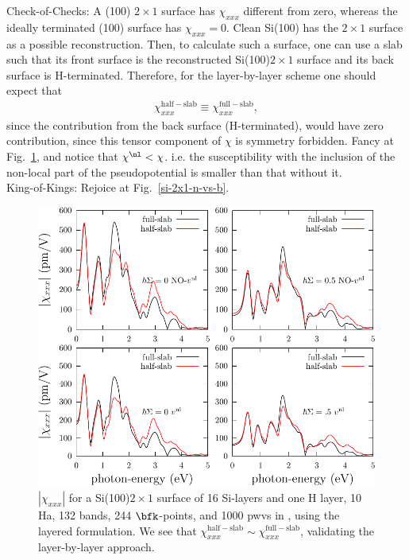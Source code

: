 Check-of-Checks: 
A (100) $2\times 1$ surface has $\chi_{xxx}$
 different from zero,
whereas the ideally terminated (100) surface has $\chi_{xxx}=0$.
Clean Si(100) has the $2\times 1$ surface as a possible
reconstruction. Then, to calculate such a surface, one can use
a slab such that its front surface is the reconstructed 
Si(100)$2\times 1$ surface and its back surface is H-terminated.
Therefore,
 for the
layer-by-layer scheme one should expect that
\begin{align}\label{cc3}
\chi^{\mathrm{half-slab}}_{xxx}
\equiv
\chi^{\mathrm{full-slab}}_{xxx}
,
\end{align}
since the contribution from the back surface (H-terminated), would
have zero contribution, since this tensor component of $\chi$ is
symmetry forbidden. Fancy at
Fig.~\ref{si-2x1}, and notice that $\chi^\nl<\chi$. i.e. the
susceptibility with the inclusion of the non-local part of the
pseudopotential is smaller than that without it.\\
King-of-Kings: Rejoice at 
Fig.~\ref{si-2x1-n-vs-b}.
\begin{figure}[b]
\centering 
\includegraphics[scale=.7]{figures/plots/shg-si-2x1-16}
\caption{$|\chi_{xxx}|$ 
for a Si(100)$2\times 1$ surface of 16 Si-layers and one H layer, 10 
Ha, 132 bands,  244 $\bfk$-points, and 1000 pwvs in \depe,
 using 
the layered formulation. We see that 
$\chi^{\mathrm{half-slab}}_{xxx}
\sim 
\chi^{\mathrm{full-slab}}_{xxx}$,
validating the layer-by-layer approach. 
}
\label{si-2x1}
\end{figure}
